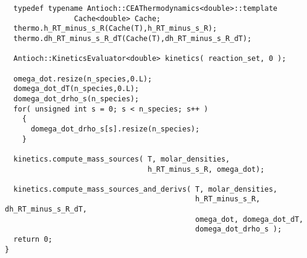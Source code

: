 \begin{verbatim}
  typedef typename Antioch::CEAThermodynamics<double>::template 
                Cache<double> Cache;
  thermo.h_RT_minus_s_R(Cache(T),h_RT_minus_s_R);
  thermo.dh_RT_minus_s_R_dT(Cache(T),dh_RT_minus_s_R_dT);

  Antioch::KineticsEvaluator<double> kinetics( reaction_set, 0 );

  omega_dot.resize(n_species,0.L);
  domega_dot_dT(n_species,0.L);
  domega_dot_drho_s(n_species);
  for( unsigned int s = 0; s < n_species; s++ )
    {
      domega_dot_drho_s[s].resize(n_species);
    }
  
  kinetics.compute_mass_sources( T, molar_densities, 
                                 h_RT_minus_s_R, omega_dot);

  kinetics.compute_mass_sources_and_derivs( T, molar_densities, 
                                            h_RT_minus_s_R, dh_RT_minus_s_R_dT,
                                            omega_dot, domega_dot_dT, 
                                            domega_dot_drho_s );
  return 0;
}
\end{verbatim}
